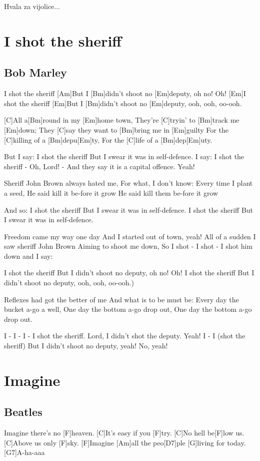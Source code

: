 \documentclass[a4paper,12pt]{article}
\begin{document}
\begin{multicols}{2}
\begin{guitar}
Hvala za vijolice...

\end{guitar}
\section{I shot the sheriff}
\subsection*{Bob Marley}
\begin{guitar}
[Em]I shot the sheriff
[Am]But I [Bm]didn't shoot 
no [Em]deputy, oh no! Oh!
[Em]I shot the sheriff
[Em]But I [Bm]didn't shoot 
no [Em]deputy, ooh, ooh, oo-ooh.


[C]All a[Bm]round in my [Em]home town,
They're [C]tryin' to [Bm]track me [Em]down;
They [C]say they want to [Bm]bring me in [Em]guilty
For the [C]killing of a [Bm]depu[Em]ty,
For the [C]life of a [Bm]dep[Em]uty.


But I say:
I shot the sheriff
But I swear it was in self-defence. 
I say: I shot the sheriff - Oh, Lord! -
And they say it is a capital offence. Yeah!


Sheriff John Brown always hated me,
For what, I don't know:
 Every time I plant a seed, 
He said kill it be-fore it grow
He said kill them be-fore it grow 


And so:
I shot the sheriff
But I swear it was in self-defence.
I shot the sheriff
But I swear it was in self-defence. 


Freedom came my way one day
And I started out of town, yeah!
All of a sudden I saw sheriff John Brown
Aiming to shoot me down,
So I shot - I shot - I shot him down and I say:


I shot the sheriff
But I didn't shoot no deputy, oh no! Oh!
I shot the sheriff
But I didn't shoot no deputy, ooh, ooh, oo-ooh.)


Reflexes had got the better of me
And what is to be must be:
Every day the bucket a-go a well,
One day the bottom a-go drop out,
One day the bottom a-go drop out.


I - I - I - I shot the sheriff.
Lord, I didn't shot the deputy. Yeah!
I - I (shot the sheriff)
But I didn't shoot no deputy, yeah! No, yeah!

\end{guitar}
\section{Imagine}
\subsection*{Beatles}
\begin{guitar}
[C]Imagine there's no [F]heaven.
[C]It's easy if you [F]try.
[C]No hell be[F]low us.
[C]Above us only [F]sky.
[F]Imagine [Am]all the peo[D7]ple [G]living for today.
[G7]A-ha-aaa



\end{guitar}
\end{multicols}
\end{document}
